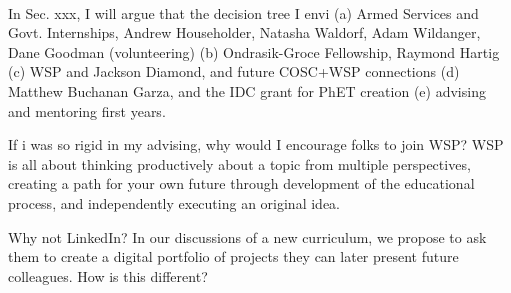 \documentclass[../../main.tex]{subfiles}
\begin{document}
\\
\vspace{0.25cm}
In Sec. xxx, I will argue that the decision tree I envi
(a) Armed Services and Govt. Internships, Andrew Householder, Natasha Waldorf, Adam Wildanger, Dane Goodman (volunteering) (b) Ondrasik-Groce Fellowship, Raymond Hartig (c) WSP and Jackson Diamond, and future COSC+WSP connections (d) Matthew Buchanan Garza, and the IDC grant for PhET creation (e) advising and mentoring first years.

If i was so rigid in my advising, why would I encourage folks to join WSP?  WSP is all about thinking productively about a topic from multiple perspectives, creating a path for your own future through development of the educational process, and independently executing an original idea. 

Why not LinkedIn?  In our discussions of a new curriculum, we propose to ask them to create a digital portfolio of projects they can later present future colleagues.  How is this different?
\end{document}
